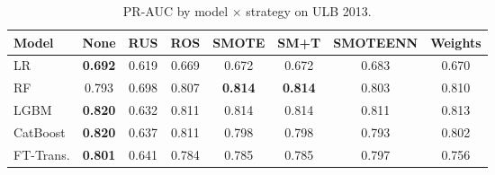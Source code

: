 \begin{table}[ht!]
\centering
\caption{PR-AUC by model $\times$ strategy on ULB 2013.}
\label{tab:factorial_ulb_prauc}
\begin{tabular}{l c c c c c c c}
\toprule
Model & None & RUS & ROS & SMOTE & SM+T & SMOTEENN & Weights \\
\midrule
LR         & \textbf{0.692} & 0.619 & 0.669 & 0.672 & 0.672 & 0.683 & 0.670 \\
RF         & 0.793 & 0.698 & 0.807 & \textbf{0.814} & \textbf{0.814} & 0.803 & 0.810 \\
LGBM       & \textbf{0.820} & 0.632 & 0.811 & 0.814 & 0.814 & 0.811 & 0.813 \\
CatBoost   & \textbf{0.820} & 0.637 & 0.811 & 0.798 & 0.798 & 0.793 & 0.802 \\
FT-Trans.  & \textbf{0.801} & 0.641 & 0.784 & 0.785 & 0.785 & 0.797 & 0.756 \\
\bottomrule
\end{tabular}
\end{table}